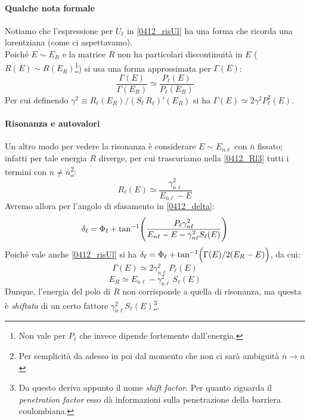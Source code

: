 \paragraph{Qualche nota formale} Notiamo che l'espressione per $U_\ell$ in \eqref{0412_risUl} ha una forma che ricorda una lorentziana (come ci aspettavamo). \\
Poiché $E\sim E_R$ e la matrice $R$ non ha particolari discontinuità in $E$ ($R(E)\sim R(E_R)$\footnote{Non vale per $P_\ell$ che invece dipende fortemente dall'energia.}) si usa una forma approssimata per $\Gamma (E)$:
$$\frac{\Gamma (E)}{\Gamma (E_R)} \simeq \frac{P_\ell (E)}{P_\ell (E_R)}$$
Per cui definendo $\gamma^2 \equiv R_\ell (E_R)/ (S_\ell\, R_\ell)' (E_R)$ si ha $\Gamma (E) \simeq 2\gamma^2 P_\ell^2 (E)$.

\paragraph{Risonanza e autovalori} Un altro modo per vedere la risonanza è considerare $E\sim E_{\bar{n}\ell}$ con $\bar{n}$ fissato; infatti per tale energia $R$ diverge, per cui trascuriamo nella \eqref{0412_Rl3} tutti i termini con $n\not = \bar{n}$\footnote{Per semplicità da adesso in poi dal momento che non ci sarà ambiguità $\bar{n}\to n$}:
$$R_\ell (E) \simeq \frac{\gamma_{\bar{n}\ell}^2}{E_{\bar{n}\ell} - E}$$
Avremo allora per l'angolo di sfasamento in \eqref{0412_delta}:
$$\delta_\ell = \Phi_\ell + \tan^{-1} \Biggl ( \frac{P_\ell \gamma^2_{n\ell}}{E_{n\ell}-E - \gamma_{n\ell}^2 S_\ell(E)} \Biggr )$$
Poiché vale anche \eqref{0412_risUl} si ha $\delta_\ell = \Phi_\ell + \tan^{-1} \Bigl ( \Gamma(E)/2(E_R-E) \Bigr )$, da cui:
$$\Gamma (E) \simeq 2  \gamma^2_{n\ell}\,P_\ell (E)$$
\begin{equation}\label{0414_ERshift}
E_R \simeq E_{n\ell} - \gamma^2_{n\ell}\, S_\ell(E)
\end{equation}
Dunque, l'energia del polo di $R$ non corrisponde a quella di risonanza, ma questa è \textit{shiftata} di un certo fattore $\gamma^2_{n\ell} S_\ell(E)$\footnote{Da questo deriva appunto il nome \textit{shift factor}. Per quanto riguarda il \textit{penetration factor} esso dà informazioni sulla penetrazione della barriera coulombiana.}.

